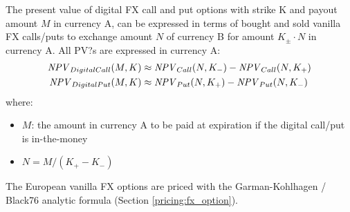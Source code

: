 The present value of digital FX call and put options with strike K and payout 
amount $M$ in currency A, can be expressed in terms of bought and sold vanilla 
FX calls/puts to exchange amount $N$ of currency B for amount $K_\pm \cdot N$ 
in currency A. All PV?s are expressed in currency A:
\begin{align*}
\mathit{NPV}_{DigitalCall}(M,K) &\approx\mathit{NPV}_{Call}(N,K_-) - \mathit{NPV}_{Call}(N,K_+) \\
\mathit{NPV}_{DigitalPut}(M,K) &\approx\mathit{NPV}_{Put}(N,K_+) - \mathit{NPV}_{Put}(N,K_-) 
\end{align*}
where:
\begin{itemize}
\item $M$: the amount in currency A to be paid at expiration if the digital 
call/put is in-the-money
\item $N = M/(K_+ - K_-)$
\end{itemize}

The European vanilla FX options are priced with the Garman-Kohlhagen / Black76
analytic formula (Section \ref{pricing:fx_option}).
